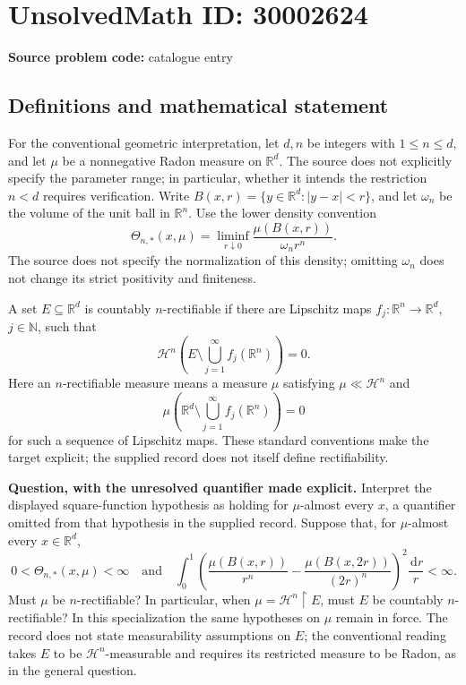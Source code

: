 \documentclass[11pt]{article}
\newcommand{\N}{\mathbb{N}}
\newcommand{\R}{\mathbb{R}}
\newcommand{\dd}{\,\mathrm{d}}
\begin{document}
\section*{UnsolvedMath ID: 30002624}
\textbf{Source problem code:} catalogue entry
\subsection{Definitions and mathematical statement}
For the conventional geometric interpretation, let \(d,n\) be integers with \(1\leq n\leq d\), and let \(\mu\) be a nonnegative Radon measure on \(\R^d\). The source does not explicitly specify the parameter range; in particular, whether it intends the restriction \(n<d\) requires verification. Write \(B(x,r)=\{y\in\R^d:|y-x|<r\}\), and let \(\omega_n\) be the volume of the unit ball in \(\R^n\). Use the lower density convention
\[
\Theta_{n,*}(x,\mu)=\liminf_{r\downarrow0}\frac{\mu(B(x,r))}{\omega_n r^n}.
\]
The source does not specify the normalization of this density; omitting \(\omega_n\) does not change its strict positivity and finiteness.

A set \(E\subseteq\R^d\) is countably \(n\)-rectifiable if there are Lipschitz maps \(f_j:\R^n\to\R^d\), \(j\in\N\), such that
\[
\mathcal H^n\!\left(E\setminus\bigcup_{j=1}^{\infty}f_j(\R^n)\right)=0.
\]
Here an \(n\)-rectifiable measure means a measure \(\mu\) satisfying \(\mu\ll\mathcal H^n\) and
\[
\mu\!\left(\R^d\setminus\bigcup_{j=1}^{\infty}f_j(\R^n)\right)=0
\]
for such a sequence of Lipschitz maps. These standard conventions make the target explicit; the supplied record does not itself define rectifiability.

\textbf{Question, with the unresolved quantifier made explicit.} Interpret the displayed square-function hypothesis as holding for \(\mu\)-almost every \(x\), a quantifier omitted from that hypothesis in the supplied record. Suppose that, for \(\mu\)-almost every \(x\in\R^d\),
\[
0<\Theta_{n,*}(x,\mu)<\infty
\quad\text{and}\quad
\int_0^1\left(\frac{\mu(B(x,r))}{r^n}-\frac{\mu(B(x,2r))}{(2r)^n}\right)^2\frac{\dd r}{r}<\infty.
\]
Must \(\mu\) be \(n\)-rectifiable? In particular, when \(\mu=\mathcal H^n\!\restriction E\), must \(E\) be countably \(n\)-rectifiable? In this specialization the same hypotheses on \(\mu\) remain in force. The record does not state measurability assumptions on \(E\); the conventional reading takes \(E\) to be \(\mathcal H^n\)-measurable and requires its restricted measure to be Radon, as in the general question.
\end{document}
